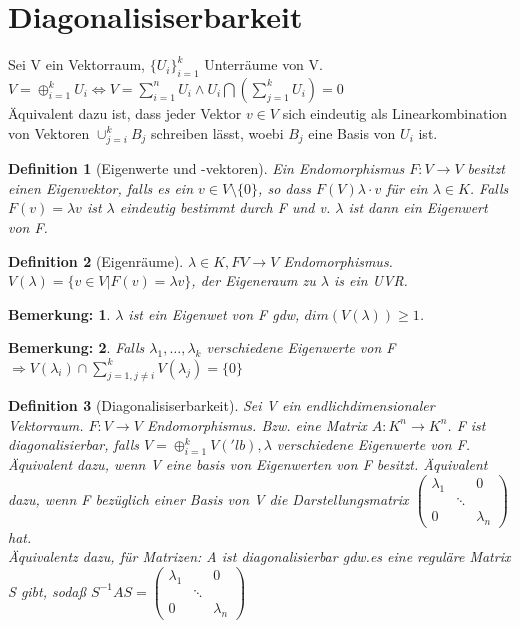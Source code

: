 \documentclass{report}
\newcommand{\lb}{\lambda}
\theoremstyle{customrem}
\newtheorem*{bemerkung}{Bemerkung\textnormal:}
\theoremstyle{customdef}
\newtheorem{definition}{Definition}[chapter]
\theoremstyle{customenv}
\begin{document}
\section{Diagonalisiserbarkeit}
Sei V ein Vektorraum, \(\{U_i\}_{i=1}^k\) Unterr\"aume von V.\\
\(V = \oplus_{i=1}^k U_i
\Leftrightarrow V = \sum_{i=1}^n U_i \land U_i \bigcap(\sum_{j=1}^k U_i) = 0\)\\
\"Aquivalent dazu ist, dass jeder Vektor \(v \in V\) sich eindeutig als
Linearkombination von Vektoren \(\cup_{j=i}^k B_j\) schreiben l\"asst, woebi
\(B_j\) eine Basis von \(U_i\) ist.

\begin{definition}[Eigenwerte und -vektoren]
  Ein Endomorphismus \(F : V \to V\) besitzt einen Eigenvektor, falls es ein
  \(v \in V \setminus \{0\}\), so dass \(F(V)  \lb \cdot v\) f\"ur ein
  \(\lb \in K\). Falls \(F(v) = \lb v\) ist \(\lambda\) eindeutig bestimmt durch
  F und v. \(\lambda\) ist dann ein Eigenwert von F.
\end{definition}

\begin{definition}[Eigenr\"aume]
  \(\lb \in K, F V \to V\) Endomorphismus.\\
  \(V(\lb) = \{v \in V | F(v) = \lb v\}\), der Eigeneraum zu \(\lb\) is ein UVR.
\end{definition}

\begin{bemerkung}
  \(\lb\) ist ein Eigenwet von F gdw, \(dim(V(\lb)) \ge 1\).
\end{bemerkung}

\begin{bemerkung}
  Falls \(\lb_1, \dots, \lb_k\) verschiedene Eigenwerte von F \(\Rightarrow
  V(\lb_i) \cap \sum_{j=1, j \neq i}^k V(\lb_j) = \{0\}\)
\end{bemerkung}


\begin{definition}[Diagonalisiserbarkeit]
  Sei V ein endlichdimensionaler Vektorraum. \(F : V \to V\) Endomorphismus.
  Bzw. eine Matrix \(A : K^n \to K^n\). F ist diagonalisierbar, falls
  \(V = \oplus_{i=1}^k V('lb), \lb\) verschiedene Eigenwerte von F.\\
  \"Aquivalent dazu, wenn V eine basis von Eigenwerten von F besitzt.
  \"Aquivalent dazu, wenn F bez\"uglich einer Basis von V die Darstellungsmatrix
  \(
    \begin{pmatrix}
      \lb_1  &        & 0\\
             & \ddots &\\
      0      &        & \lb_n
    \end{pmatrix}
  \) hat.\\
  \"Aquivalentz dazu, f\"ur Matrizen: A ist diagonalisierbar gdw.es eine regul\"are
  Matrix S gibt, soda\ss{} \(S^{-1}AS = 
  \begin{pmatrix}
    \lb_1  &        & 0\\
           & \ddots &\\
    0      &        & \lb_n
  \end{pmatrix}\)
\end{definition}
\end{document}
